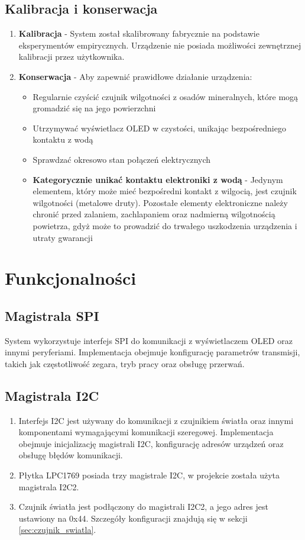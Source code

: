 \documentclass{article}
\begin{document}
\subsection{Kalibracja i konserwacja}
\begin{enumerate}
    \item \textbf{Kalibracja} - System został skalibrowany fabrycznie na podstawie eksperymentów empirycznych. Urządzenie nie posiada możliwości zewnętrznej kalibracji przez użytkownika.
    
    \item \textbf{Konserwacja} - Aby zapewnić prawidłowe działanie urządzenia:
    \begin{itemize}
        \item Regularnie czyścić czujnik wilgotności z osadów mineralnych, które mogą gromadzić się na jego powierzchni
        \item Utrzymywać wyświetlacz OLED w czystości, unikając bezpośredniego kontaktu z wodą
        \item Sprawdzać okresowo stan połączeń elektrycznych
        \item \textbf{Kategorycznie unikać kontaktu elektroniki z wodą} - Jedynym elementem, który może mieć bezpośredni kontakt z wilgocią, jest czujnik wilgotności (metalowe druty). Pozostałe elementy elektroniczne należy chronić przed zalaniem, zachlapaniem oraz nadmierną wilgotnością powietrza, gdyż może to prowadzić do trwałego uszkodzenia urządzenia i utraty gwarancji
    \end{itemize}
\end{enumerate}

\section{Funkcjonalności}

\subsection{Magistrala SPI}
System wykorzystuje interfejs SPI do komunikacji z wyświetlaczem OLED oraz innymi peryferiami. Implementacja obejmuje konfigurację parametrów transmisji, takich jak częstotliwość zegara, tryb pracy oraz obsługę przerwań.

\subsection{Magistrala I2C}
\begin{enumerate}
    \item Interfejs I2C jest używany do komunikacji z czujnikiem światła oraz innymi komponentami wymagającymi komunikacji szeregowej. Implementacja obejmuje inicjalizację magistrali I2C, konfigurację adresów urządzeń oraz obsługę błędów komunikacji.
    \item Płytka LPC1769 posiada trzy magistrale I2C, w projekcie została użyta magistrala I2C2. 
    \item Czujnik światła jest podłączony do magistrali I2C2, a jego adres jest ustawiony na 0x44. Szczegóły konfiguracji znajdują się w sekcji \ref{sec:czujnik_swiatla}.
\end{enumerate}
\end{document}
